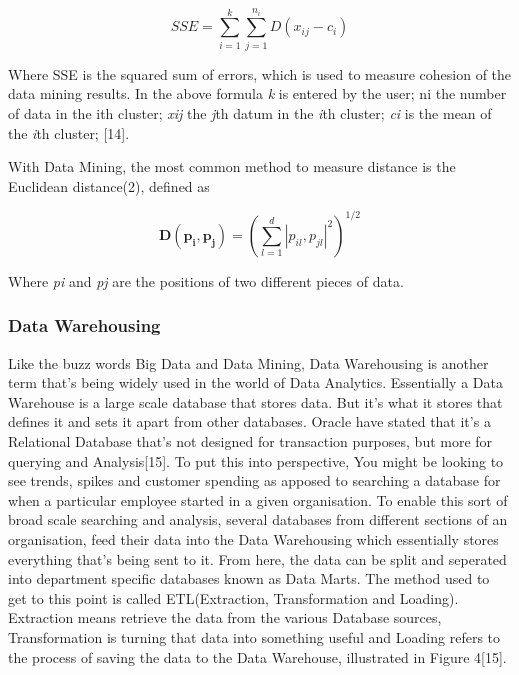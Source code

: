 \documentclass[10pt,journal,compsoc]{IEEEtran}
\begin{document}
\begin{equation}
	SSE = \sum_{i=1}^{k} \sum_{j=1}^{n_i} D( x_{ij} - c_i)
\end{equation}

Where SSE is the squared sum of errors, which is used to measure cohesion of the data mining results. In the above formula \textit{k} is entered by the user; ni the number of
data in the ith cluster; \textit{xij} the \textit{j}th datum in the \textit{i}th cluster; \textit{ci} is the mean of the \textit{i}th cluster; [14]. 

With Data Mining, the most common method to measure distance is the Euclidean distance(2), defined as

\begin{equation}
\mathbf{D(p_{i}, p_{j})} = 
\left(
\sum_{l=1}^{d} |p_{il}, p_{jl}|^2
\right)^{1/2}
\end{equation}

Where \textit{pi} and \textit{pj} are the positions of two different pieces of data.

\subsubsection{Data Warehousing}
Like the buzz words Big Data and Data Mining, Data Warehousing is another term that's being widely used in the world of Data Analytics. Essentially a Data Warehouse is a large scale database that stores data. But it's what it stores that defines it and sets it apart from other databases. Oracle have stated that it's a Relational Database that's not designed for transaction purposes, but more for querying and Analysis[15]. To put this into perspective, You might be looking to see trends, spikes and customer spending as apposed to searching a database for when a particular employee started in a given organisation. To enable this sort of broad scale searching and analysis, several databases from different sections of an organisation, feed their data into the Data Warehousing which essentially stores everything that's being sent to it. From here, the data can be split and seperated into department specific databases known as Data Marts. The method used to get to this point is called ETL(Extraction, Transformation and Loading). Extraction means retrieve the data from the various Database sources, Transformation is turning that data into something useful and Loading refers to the process of saving the data to the Data Warehouse, illustrated in Figure 4[15].\\
\end{document}
